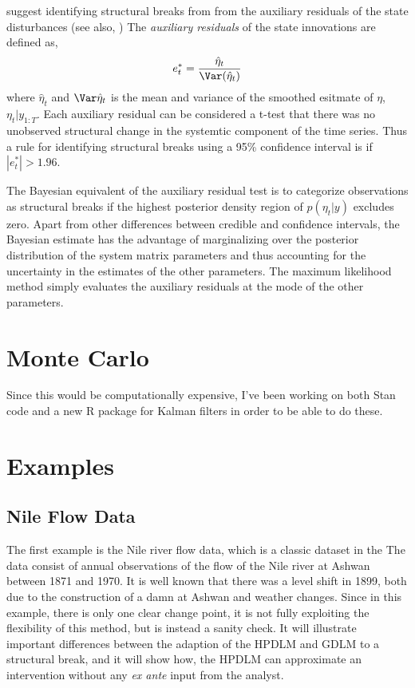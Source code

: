 \documentclass{article}
\begin{document}
\begin{itemize}
\textcite{DurbinKoopman2012} suggest identifying structural breaks from from the auxiliary residuals of the state disturbances (see also, \textcite{JongPenzer1998})
The \textit{auxiliary residuals} of the state innovations are defined as,
\begin{equation}
  \label{eq:12}
  e^{*}_{t} = \frac{\hat \eta_{t}}{\Var (\hat \eta_{t})}
\end{equation}
where $\hat \eta_{t}$ and $\Var \hat \eta_{t}$ is the mean and variance of the smoothed esitmate of $\eta$, $\eta_{t} | y_{1:T}$.
Each auxiliary residual can be considered a t-test that there was no unobserved structural change in the systemtic component of the time series.
Thus a rule for identifying structural breaks using a 95\% confidence interval is if $|e^{*}_{t}| > 1.96$.

The Bayesian equivalent of the auxiliary residual test is to categorize observations as structural breaks if the highest posterior density region of $p(\eta_{t} | y)$ excludes zero.
Apart from other differences between credible and confidence intervals, the Bayesian estimate has the advantage of marginalizing over the posterior distribution of the system matrix parameters and thus accounting for the  uncertainty in the estimates of the other parameters.
The maximum likelihood method simply evaluates the auxiliary residuals at the mode of the other parameters.

\section{Monte Carlo}
\label{sec:monte-carlo}

Since this would be computationally expensive, I've been working on both Stan code and a new R package for Kalman filters in order to be able to do these.

\section{Examples}
\label{sec:examples}

\subsection{Nile Flow Data}
\label{sec:nile}

The first example is the Nile river flow data, which is a classic dataset in the  \parencites{Cobb1978}{Balke1993}{JongPenzer1998}{DurbinKoopman2001}{DurbinKoopman2012}
The data consist of annual observations of the flow of the Nile river at Ashwan between 1871 and 1970.
It is well known that there was a level shift in 1899, both due to the construction of a damn at Ashwan and weather changes.
Since in this example, there is only one clear change point, it is not fully exploiting the flexibility of this method, but is instead a sanity check.
It will illustrate important differences between the adaption of the HPDLM and GDLM to a structural break,
and it will show how, the HPDLM can approximate an intervention without any \textit{ex ante} input from the analyst.


\end{itemize}
\end{document}
